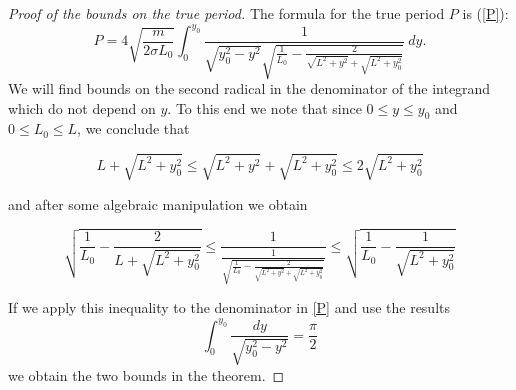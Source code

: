 \documentclass[10pt,a4paper]{amsart}
\renewcommand{\leq}{\leqslant}  %
\begin{document}
\begin{proof}[Proof of the bounds on the true period]
The formula for the true period $P$ is (\eqref{P}):
$$
P=4\sqrt{\frac{m}{2\sigma L_0}}\int_{0}^{y_0}\frac{1}{\sqrt{y_0^2-y^2}\sqrt{\frac{1}{L_0}-\frac{2}{\sqrt{L^2+y^2}+\sqrt{L^2+y_0^2}}}}~dy.
$$
We will find bounds on the second radical in the denominator of the integrand which do not depend on $y$. 
To this end we note that since $0\leq y\leq y_0$ and $0\leq L_0\leq L$, we conclude that

$$
L+\sqrt{L^2+y_0^2}\leq \sqrt{L^2+y^2}+\sqrt{L^2+y_0^2}\leq 2\sqrt{L^2+y_0^2}
$$

\noindent and after some algebraic manipulation we obtain

\begin{equation}
\label{bounds}
\sqrt{\frac{1}{L_0}-\frac{2}{L+\sqrt{L^2+y_0^2}}}\leq\frac{1}{\frac{1}{\sqrt{\frac{1}{L_0}-\frac{2}{\sqrt{L^2+y^2}+\sqrt{L^2+y_0^2}}}}}\leq\sqrt{\frac{1}{L_0}-\frac{1}{\sqrt{L^2+y_0^2}}}
\end{equation}

If we apply this inequality to the denominator in \eqref{P} and use the results
$$
\int_{0}^{y_0}\frac{dy}{\sqrt{y_0^2-y^2}}=\frac{\pi}{2}
$$
we obtain the two bounds in the theorem.
\end{proof}
\end{document}
